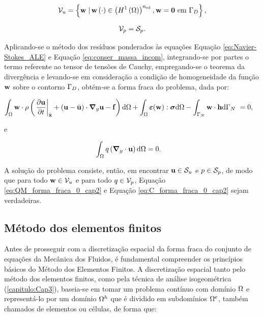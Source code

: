 \begin{align}
\mathcal{V}_u = \left\{\mathbf{w} \left . \right| \mathbf{w} \left(\cdot\right) \in \left(H^{1}\left(\Omega\right)\right)^{{n_{\mathrm{sd}}}}, \mathbf{w} = \mathbf{0} \textrm { em} \ \Gamma_{D} \right\},
\end{align}

\begin{align}
\mathcal{V}_p = \mathcal{S}_p.
\end{align}

Aplicando-se o método dos resíduos ponderados às equações Equação \eqref{eq:Navier-Stokes_ALE} e Equação \eqref{eq:conser_massa_incom}, integrando-se por partes o termo referente ao tensor de tensões de Cauchy, empregando-se o teorema da divergência e levando-se em consideração a condição de homogeneidade da função $\mathbf{w}$ sobre o contorno $\Gamma_{D}$, obtém-se a forma fraca do problema, dada por:

\begin{align}
\int_{\Omega} \mathbf{w} \cdot \rho  \left(\left . \frac{\partial\mathbf{u}}{\partial t} \right|_{\bar{\mathbf{x}}} + \left(\mathbf{u} - \bar{\mathbf{u}} \right)\cdot\boldsymbol{\nabla}_y \mathbf{u} - \mathbf{f} \right) \mathrm{d} \Omega + \int_{\Omega} \bm{\varepsilon}(\mathbf{w}) : \boldsymbol{\sigma}  \mathrm{d} \Omega - \int_{\Gamma_{N}} \mathbf{w} \cdot \mathbf{h} \mathrm{d}\Gamma_{N}  \  &= 0,  \label{eq:QM_forma_fraca_0_cap2} 
\end{align}

\noindent e

\begin{align}
\int_{\Omega} q \left(\boldsymbol{\nabla}_y \cdot \mathbf{u}\right) \mathrm{d} \Omega &= 0. \label{eq:C_forma_fraca_0_cap2} 
\end{align}

A solução do problema consiste, então, em encontrar $\mathbf{u} \in \mathcal{S}_u$ e $p \in \mathcal{S}_p$, de modo que para todo $\mathbf{w} \in \mathcal{V}_u$ e para todo $q \in \mathcal{V}_p$, Equação \eqref{eq:QM_forma_fraca_0_cap2} e Equação \eqref{eq:C_forma_fraca_0_cap2} sejam verdadeiras.

\subsection{Método dos elementos finitos } \label{capitulo:Cap2:FormaFraca:ElementosFinitos}

Antes de prosseguir com a discretização espacial da forma fraca do conjunto de equações da Mecânica dos Fluidos, é fundamental compreender os princípios básicos do Método dos Elementos Finitos.  A discretização espacial tanto pelo método dos elementos finitos, como pela técnica de análise isogeométrica (\autoref{capitulo:Cap3}), baseia-se em tomar um problema contínuo com domínio $\Omega$ e representá-lo por um domínio $\Omega^h$ que é dividido em subdomínios $\Omega^e$, também chamados de elementos ou células, de forma que:

